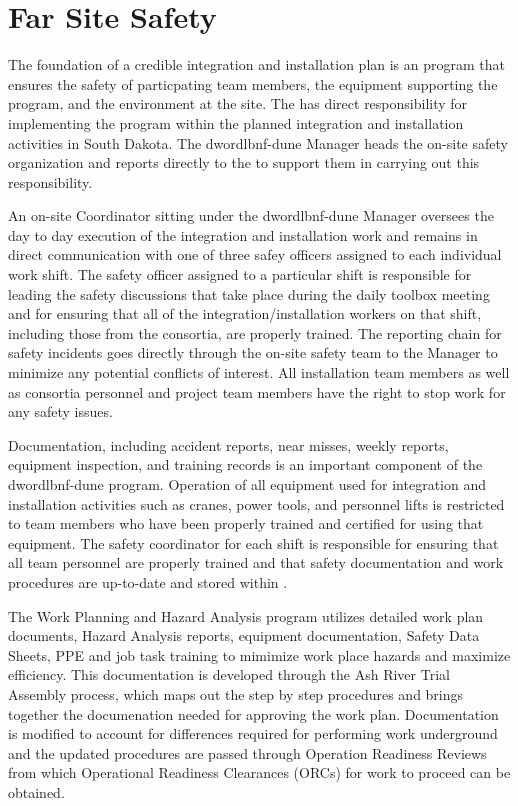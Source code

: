 \section{Far Site Safety}
\label{sec:far_site_safety}

The foundation of a credible integration and installation plan is 
an  program that ensures the safety of particpating team 
members, the equipment supporting the program, and the environment 
at the  site.  The  has direct responsibility 
for implementing the   program within 
the planned integration and installation activities in South Dakota.  
The dword{lbnf-dune}  Manager heads the on-site safety 
organization and reports directly to the  to support them
in carrying out this responsibility.

An on-site  Coordinator sitting under the dword{lbnf-dune} 
 Manager oversees the day to day execution of the integration 
and installation work and remains in direct communication with one of 
three safey officers assigned to each individual work shift.  The safety 
officer assigned to a particular shift is responsible for leading the 
safety discussions that take place during the daily toolbox meeting and 
for ensuring that all of the integration/installation workers on that 
shift, including those from the consortia, are properly trained.  The 
reporting chain for safety incidents goes directly through the on-site 
safety team to the   Manager to minimize 
any potential conflicts of interest.  All  installation team 
members as well as  consortia personnel and  project 
team members have the right to stop work for any safety issues.

Documentation, including accident reports, near misses, weekly reports, 
equipment inspection, and training records is an important component of 
the dword{lbnf-dune}  program.  Operation of all equipment 
used for integration and installation activities such as cranes, power 
tools, and personnel lifts is restricted to team members who have been
properly trained and certified for using that equipment.  The safety 
coordinator for each shift is responsible for ensuring that all team 
personnel are properly trained and that safety documentation and work 
procedures are up-to-date and stored within .  

The Work Planning and Hazard Analysis program utilizes detailed work
plan documents, Hazard Analysis reports, equipment documentation,
Safety Data Sheets, PPE and job task training to mimimize work place
hazards and maximize efficiency.  This documentation is developed
through the Ash River Trial Assembly process, which maps out the 
step by step procedures and brings together the documenation needed 
for approving the work plan.  Documentation is modified to account for  
differences required for performing work underground and the updated 
procedures are passed through Operation Readiness Reviews from which   
Operational Readiness Clearances (ORCs) for work to proceed can be 
obtained.


